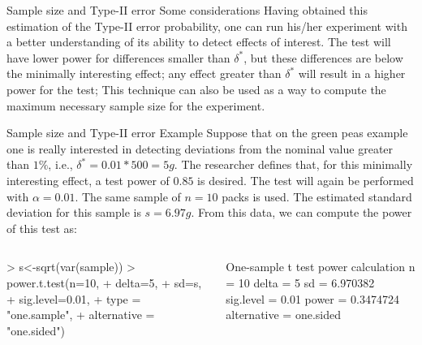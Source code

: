 \documentclass[t]{beamer}
\begin{document}

\begin{ftst}
{Sample size and Type-II error}
{Some considerations}
Having obtained this estimation of the Type-II error probability, one can run his/her experiment with a better understanding of its ability to detect effects of interest.
\vone
The test will have lower power for differences smaller than $\delta^*$, but these differences are below the minimally interesting effect; any effect greater than $\delta^*$ will result in a higher power for the test;
\vone
This technique can also be used as a way to compute the maximum necessary sample size for the experiment.
\end{ftst}


\begin{ftstf}
{Sample size and Type-II error}
{Example}
Suppose that on the green peas example one is really interested in detecting deviations from the nominal value greater than $1\%$, i.e., $\delta^* = 0.01*500 = 5g$. The researcher defines that, for this minimally interesting effect, a test power of $0.85$ is desired. The test will again be performed with $\alpha = 0.01$.
\vone
The same sample of $n=10$ packs is used. The estimated standard deviation for this sample is $s=6.97g$. From this data, we can compute the power of this test as:
\begin{columns}
\begin{rcode}
> s<-sqrt(var(sample))
> power.t.test(n=10, 
+        delta=5, 
+        sd=s, 
+        sig.level=0.01, 
+        type = "one.sample", 
+        alternative = "one.sided")
\end{rcode}
\begin{rcode}
One-sample t test power calculation 
n = 10
delta = 5
sd = 6.970382
sig.level = 0.01
power = 0.3474724
alternative = one.sided
\end{rcode}
\end{columns}
\end{ftstf}
\end{document}
